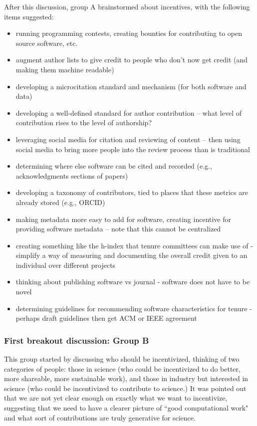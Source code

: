 \documentclass[11pt, oneside]{amsart}
\begin{document}
After this discussion, group A brainstormed about incentives,
with the following items suggested:
\begin{itemize}
\item running programming contests, creating bounties for contributing to open source software, etc.
\item augment author lists to give credit to people who don't now get credit (and making them machine readable)
\item developing a microcitation standard and mechanism (for both software and data)
\item developing a well-defined standard for author contribution -- what level of contribution rises to the level of authorship?
\item leveraging social media for citation and reviewing of content -- then using social media to bring more people into the review process than is traditional
\item determining where else software can be cited and recorded (e.g., acknowledgments sections of papers)
\item developing a taxonomy of contributors, tied to places that these metrics are already stored (e.g., ORCID)
\item making metadata more easy to add for software, creating incentive for providing software metadata -- note that this cannot be centralized
\item creating something like the h-index that tenure committees can make use of - simplify a way of measuring and documenting the overall credit given to an individual over different projects
\item thinking about publishing software vs journal - software does not have to be novel
\item determining guidelines for recommending software characteristics for tenure - perhaps draft guidelines then get ACM or IEEE agreement
\end{itemize}


\subsubsection{First breakout discussion: Group B}

This group started by discussing who should be incentivized, thinking of two categories of people:  
those in science (who could be incentivized to do better, more shareable, more sustainable work), and
those in industry but interested in science (who could be incentivized to contribute to science.)  It was pointed out that we are not yet clear enough on exactly what we want to incentivize, suggesting that we need to have a clearer picture of ``good computational work" and what sort of contributions are truly generative for science.
\end{document}
